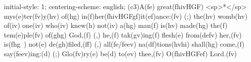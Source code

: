 initial-style: 1;
centering-scheme: english;
(c3)A(fe) great(fhivHGF) <sp>*</sp> mys(e)ter(fv)y(hv) of(hg) in(f)her(fhivHGFgf)it(ef)ance:(fv) (;) the(hv) womb(hv) of(iv) one(iv) who(iv) knew(h) not(iv) a(hg) man(f) is(hv) made(hg) the(f) tem(e)ple(fv) of(ghg) God,(f) (,) he,(f) tak(gv)ing(f) flesh(e) from(defv) her,(fv) is(fhg~) not(e) de(gh)filed,(ff) (,) all(fe/feev) na(df)tions(hvhi) shall(hg) come,(f) say(feev)ing:(d) (;) Glo(fv)ry(e) be(d) to(ev) thee,(fv) O(fhivHGFef) Lord.(fv)